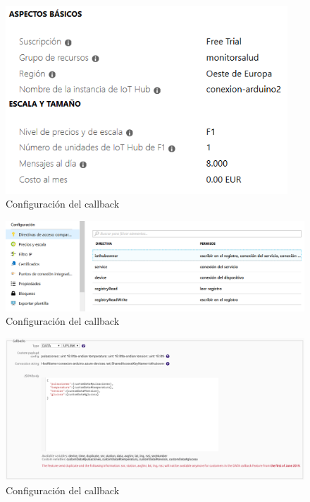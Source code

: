 \documentclass[12pt,a4paper]{article}
\begin{document}
\begin{figure}[!h]
\begin{center}
\includegraphics[width=300pt]{Azurecreacion.png}
\caption{Configuración del callback}
\label{acr}
\end{center}
\end{figure}

\begin{figure}[!h]
\begin{center}
\includegraphics[width=\textwidth]{Azureclave.png}
\caption{Configuración del callback}
\label{acl}
\end{center}
\end{figure}

\begin{figure}[h!]
\begin{center}
\includegraphics[width=\textwidth]{callback.png}
\caption{Configuración del callback}
\label{b}
\end{center}
\end{figure}
\end{document}
